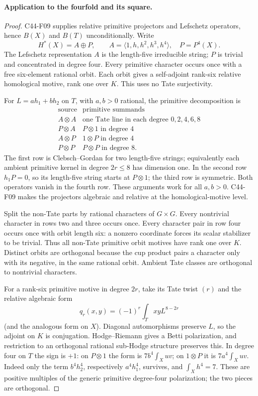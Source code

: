 \documentclass[11pt]{article}
\theoremstyle{remark}\newtheorem{remark}[theorem]{Remark}
\begin{document}
\paragraph{Application to the fourfold and its square.}
\begin{proof}
C44-F09 supplies relative primitive projectors and Lefschetz operators,
hence \(B(X)\) and \(B(T)\) unconditionally. Write
\[
 H^*(X)=A\oplus P,\qquad
 A=\langle1,h,h^2,h^3,h^4\rangle,\quad P=P^4(X).
\]
The Lefschetz representation \(A\) is the length-five irreducible
string; \(P\) is trivial and concentrated in degree four. Every
primitive character occurs once with a free six-element rational
orbit. Each orbit gives a self-adjoint rank-six relative homological
motive, rank one over \(K\). This uses no Tate surjectivity.

For \(L=a h_1+b h_2\) on \(T\), with \(a,b>0\) rational, the
primitive decomposition is
\[
\begin{array}{c|l}
 \text{source}&\text{primitive summands}\\ \hline
 A\otimes A&\text{one Tate line in each degree }0,2,4,6,8\\
 P\otimes A&P\otimes1\text{ in degree }4\\
 A\otimes P&1\otimes P\text{ in degree }4\\
 P\otimes P&P\otimes P\text{ in degree }8 .
\end{array}
\]
The first row is Clebsch--Gordan for two length-five strings;
equivalently each ambient primitive kernel in degree \(2r\le8\)
has dimension one. In the second row \(h_1P=0\), so its length-five
string starts at \(P\otimes1\); the third row is symmetric. Both
operators vanish in the fourth row. These arguments work for all
\(a,b>0\). C44-F09 makes the projectors algebraic and relative at
the homological-motive level.

Split the non-Tate parts by rational characters of \(G\times G\).
Every nontrivial character in rows two and three occurs once.
Every character pair in row four occurs once with orbit length
six: a nonzero coordinate forces its scalar stabilizer to be trivial.
Thus all non-Tate primitive orbit motives have rank one over \(K\).
Distinct orbits are orthogonal because the cup product pairs a
character only with its negative, in the same rational orbit.
Ambient Tate classes are orthogonal to nontrivial characters.

For a rank-six primitive motive in degree \(2r\), take its Tate
twist \((r)\) and the relative algebraic form
\[
 q_r(x,y)=(-1)^r\int_TxyL^{8-2r}
\]
(and the analogous form on \(X\)). Diagonal automorphisms preserve
\(L\), so the adjoint on \(K\) is conjugation. Hodge--Riemann gives
a Betti polarization, and restriction to an orthogonal rational
sub-Hodge structure preserves this. In degree four on \(T\) the
sign is \(+1\): on \(P\otimes1\) the form is \(7b^4\int_Xuv\);
on \(1\otimes P\) it is \(7a^4\int_Xuv\). Indeed only the term
\(b^4h_2^4\), respectively \(a^4h_1^4\), survives, and
\(\int_Xh^4=7\). These are positive multiples of the generic
primitive degree-four polarization; the two pieces are orthogonal.


\end{proof}
\end{document}
